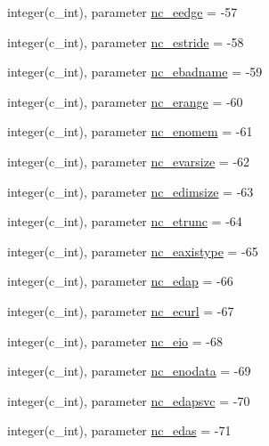 \begin{DoxyCompactItemize}
\item 
integer(c\+\_\+int), parameter \hyperlink{namespacenetcdf__nc__data_a17523983ee6366a4460590b0a0622c40}{nc\+\_\+eedge} = -\/57
\item 
integer(c\+\_\+int), parameter \hyperlink{namespacenetcdf__nc__data_a687c32103bfa8244d01676f38387111c}{nc\+\_\+estride} = -\/58
\item 
integer(c\+\_\+int), parameter \hyperlink{namespacenetcdf__nc__data_a83da43e44429a69f612c4c22bc7b597f}{nc\+\_\+ebadname} = -\/59
\item 
integer(c\+\_\+int), parameter \hyperlink{namespacenetcdf__nc__data_aac3d60689bcec8bf0eb3450d445eab46}{nc\+\_\+erange} = -\/60
\item 
integer(c\+\_\+int), parameter \hyperlink{namespacenetcdf__nc__data_a80cce55761ff64b987641fe6f2e05821}{nc\+\_\+enomem} = -\/61
\item 
integer(c\+\_\+int), parameter \hyperlink{namespacenetcdf__nc__data_a59fa828790c0a023fd1599da7ec76a8b}{nc\+\_\+evarsize} = -\/62
\item 
integer(c\+\_\+int), parameter \hyperlink{namespacenetcdf__nc__data_a00bc858d354d8005d17b50e0634119cd}{nc\+\_\+edimsize} = -\/63
\item 
integer(c\+\_\+int), parameter \hyperlink{namespacenetcdf__nc__data_a9d18fecf9930af7fe5f7120637546b63}{nc\+\_\+etrunc} = -\/64
\item 
integer(c\+\_\+int), parameter \hyperlink{namespacenetcdf__nc__data_af7013322b1cad29cb08115055161b135}{nc\+\_\+eaxistype} = -\/65
\item 
integer(c\+\_\+int), parameter \hyperlink{namespacenetcdf__nc__data_a45770cfd01d969718e0b364d475790c6}{nc\+\_\+edap} = -\/66
\item 
integer(c\+\_\+int), parameter \hyperlink{namespacenetcdf__nc__data_a324478369df20d472575fd95ebcff1e2}{nc\+\_\+ecurl} = -\/67
\item 
integer(c\+\_\+int), parameter \hyperlink{namespacenetcdf__nc__data_ad4cd38f0b1af055f833c9fd514c8c53c}{nc\+\_\+eio} = -\/68
\item 
integer(c\+\_\+int), parameter \hyperlink{namespacenetcdf__nc__data_a09e4229d656b07b898b8df41c179bdfb}{nc\+\_\+enodata} = -\/69
\item 
integer(c\+\_\+int), parameter \hyperlink{namespacenetcdf__nc__data_aef772139dee477b025ac854248d88196}{nc\+\_\+edapsvc} = -\/70
\item 
integer(c\+\_\+int), parameter \hyperlink{namespacenetcdf__nc__data_ac5a55bad25b5ba22b277c485abd35d61}{nc\+\_\+edas} = -\/71

\end{DoxyCompactItemize}

